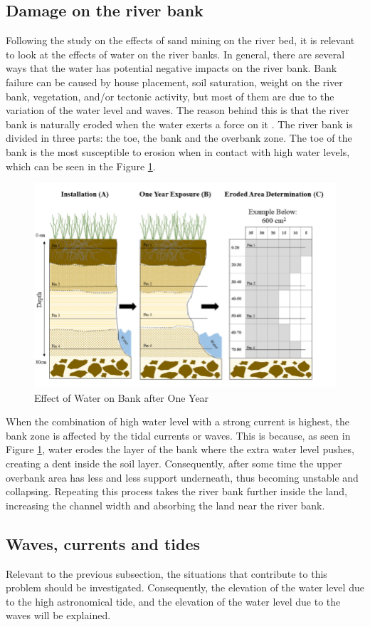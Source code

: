 \subsection{Damage on the river bank}
\label{chap 6: effect and damage on the river bank}
Following the study on the effects of sand mining on the river bed, it is relevant to look at the effects of water on the river banks. In general, there are several ways that the water has potential negative impacts on the river bank. Bank failure can be caused by house placement, soil saturation, weight on the river bank, vegetation, and/or tectonic activity, but most of them are due to the variation of the water level and waves. The reason behind this is that the river bank is naturally eroded when the water exerts a force on it \autocite{governmentofsouthaustraliaRiverbankCollapse2024}.
The river bank is divided in three parts: the toe, the bank and the overbank zone. The toe of the bank is the most susceptible to erosion when in contact with high water levels, which can be seen in the Figure \ref{fig:Effect of Water on Bank after One Year}.

\begin{figure}[H]
    \centering
    \includegraphics[width=0.5\linewidth]{figures/ch2/Erosion.png}
    \caption{Effect of Water on Bank after One Year}
    \label{fig:Effect of Water on Bank after One Year}
\end{figure}

When the combination of high water level with a strong current is highest, the bank zone is affected by the tidal currents or waves. This is because, as seen in Figure \ref{fig:Effect of Water on Bank after One Year}, water erodes the layer of the bank where the extra water level pushes, creating a dent inside the soil layer.
Consequently, after some time the upper overbank area has less and less support underneath, thus becoming unstable and collapsing. 
Repeating this process takes the river bank further inside the land, increasing the channel width and absorbing the land near the river bank. 


\subsection{Waves, currents and tides}
Relevant to the previous subsection, the situations that contribute to this problem should be investigated. Consequently, the elevation of the water level due to the high astronomical tide, and the elevation of the water level due to the waves will be explained.

